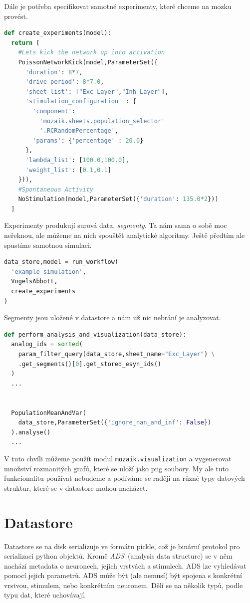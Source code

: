 Dále je potřeba specifikovat samotné experimenty, které chceme na mozku provést.

\begin{lstlisting}[language=Python]
def create_experiments(model):
  return [
    #Lets kick the network up into activation
    PoissonNetworkKick(model,ParameterSet({
      'duration': 8*7,
      'drive_period': 8*7.0,
      'sheet_list': ["Exc_Layer","Inh_Layer"],
      'stimulation_configuration' : {
        'component':
          'mozaik.sheets.population_selector'
          '.RCRandomPercentage',
        'params': {'percentage' : 20.0}
      },
      'lambda_list': [100.0,100.0],
      'weight_list': [0.1,0.1]
    })),
    #Spontaneous Activity 
    NoStimulation(model,ParameterSet({'duration': 135.0*2}))
  ]
\end{lstlisting}

Experimenty produkují surová data, \emph{segmenty}. Ta nám sama o sobě moc neřeknou, ale můžeme na nich spouštět analytické algoritmy. Ještě předtím ale spustíme samotnou simulaci.

\begin{lstlisting}[language=Python]
data_store,model = run_workflow(
  'example simulation',
  VogelsAbbott,
  create_experiments
)
\end{lstlisting}

Segmenty jsou uložené v datastore a nám už nic nebrání je analyzovat.

\begin{lstlisting}[language=Python]
def perform_analysis_and_visualization(data_store):
  analog_ids = sorted(
    param_filter_query(data_store,sheet_name="Exc_Layer") \
    .get_segments()[0].get_stored_esyn_ids()
  )
  ...

  
  PopulationMeanAndVar(
    data_store,ParameterSet({'ignore_nan_and_inf': False})
  ).analyse()
  ...
\end{lstlisting}

V tuto chvíli můžeme použít modul \lstinline|mozaik.visualization| a vygenerovat množství rozmanitých grafů, které se uloží jako png soubory. My ale tuto funkcionalitu používat nebudeme a podíváme se raději na různé typy datových struktur, které se v datastore mohou nacházet.

\section{Datastore}

Datastore se na disk serializuje ve formátu pickle, což je binární protokol pro serializaci python objektů. Kromě \emph{ADS}~(analysis data structure) se v něm nachází metadata o neuronech, jejich vrstvách a stimulech. ADS lze vyhledávat pomocí jejich parametrů. ADS může být (ale nemusí) být spojena s konkrétní vrstvou, stimulem, nebo konkrétním neuronem. Dělí se na několik typů, podle typu dat, které uchovávají.


